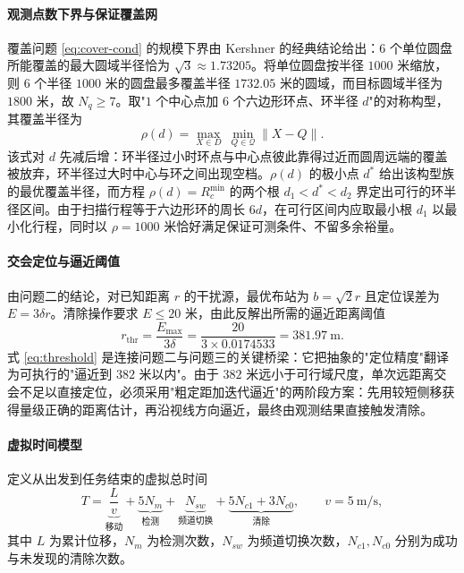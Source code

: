 \paragraph{观测点数下界与保证覆盖网} 覆盖问题 \eqref{eq:cover-cond} 的规模下界由 Kershner 的经典结论给出：$6$ 个单位圆盘所能覆盖的最大圆域半径恰为 $\sqrt3\approx1.73205$。将单位圆盘按半径 $1000$ 米缩放，则 $6$ 个半径 $1000$ 米的圆盘最多覆盖半径 $1732.05$ 米的圆域，而目标圆域半径为 $1800$ 米，故 $N_q\ge7$。取"$1$ 个中心点加 $6$ 个六边形环点、环半径 $d$"的对称构型，其覆盖半径为
\begin{equation}
\rho(d)=\max_{X\in D}\ \min_{Q\in\mathcal Q}\lVert X-Q\rVert .
\label{eq:rho-d}
\end{equation}
该式对 $d$ 先减后增：环半径过小时环点与中心点彼此靠得过近而圆周远端的覆盖被放弃，环半径过大时中心与环之间出现空档。$\rho(d)$ 的极小点 $d^{*}$ 给出该构型族的最优覆盖半径，而方程 $\rho(d)=R_c^{\min}$ 的两个根 $d_1<d^{*}<d_2$ 界定出可行的环半径区间。由于扫描行程等于六边形环的周长 $6d$，在可行区间内应取最小根 $d_1$ 以最小化行程，同时以 $\rho=1000$ 米恰好满足保证可测条件、不留多余裕量。

\paragraph{交会定位与逼近阈值} 由问题二的结论，对已知距离 $r$ 的干扰源，最优布站为 $b=\sqrt2r$ 且定位误差为 $E=3\delta r$。清除操作要求 $E\le20$ 米，由此反解出所需的逼近距离阈值
\begin{equation}
r_{\mathrm{thr}}=\frac{E_{\max}}{3\delta}=\frac{20}{3\times0.0174533}=381.97\ \text{m}.
\label{eq:threshold}
\end{equation}
式 \eqref{eq:threshold} 是连接问题二与问题三的关键桥梁：它把抽象的"定位精度"翻译为可执行的"逼近到 $382$ 米以内"。由于 $382$ 米远小于可行域尺度，单次远距离交会不足以直接定位，必须采用"粗定距加迭代逼近"的两阶段方案：先用较短侧移获得量级正确的距离估计，再沿视线方向逼近，最终由观测结果直接触发清除。

\paragraph{虚拟时间模型} 定义从出发到任务结束的虚拟总时间
\begin{equation}
T=\underbrace{\frac{L}{v}}_{\text{移动}}+\underbrace{5N_m}_{\text{检测}}
+\underbrace{N_{sw}}_{\text{频道切换}}
+\underbrace{5N_{c1}+3N_{c0}}_{\text{清除}},
\qquad v=5\ \text{m/s},
\label{eq:time-model}
\end{equation}
其中 $L$ 为累计位移，$N_m$ 为检测次数，$N_{sw}$ 为频道切换次数，$N_{c1},N_{c0}$ 分别为成功与未发现的清除次数。

